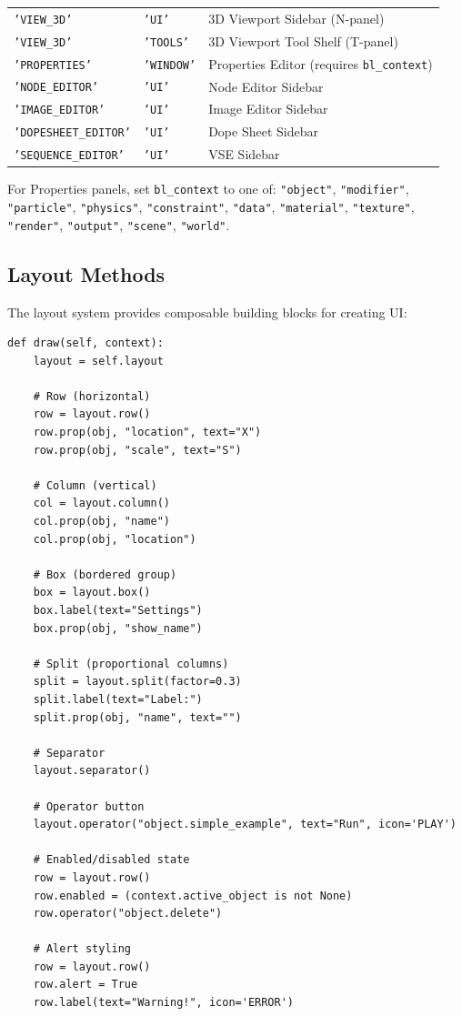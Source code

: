 \begin{center}
\begin{tabularx}{\textwidth}{L{3.8cm}L{2.8cm}X}
\toprule
{}
 &  &  \\
\midrule
\texttt{'VIEW\_3D'} & \texttt{'UI'} & 3D Viewport Sidebar (N-panel) \\
\texttt{'VIEW\_3D'} & \texttt{'TOOLS'} & 3D Viewport Tool Shelf (T-panel) \\
\texttt{'PROPERTIES'} & \texttt{'WINDOW'} & Properties Editor (requires \texttt{bl\_context}) \\
\texttt{'NODE\_EDITOR'} & \texttt{'UI'} & Node Editor Sidebar \\
\texttt{'IMAGE\_EDITOR'} & \texttt{'UI'} & Image Editor Sidebar \\
\texttt{'DOPESHEET\_EDITOR'} & \texttt{'UI'} & Dope Sheet Sidebar \\
\texttt{'SEQUENCE\_EDITOR'} & \texttt{'UI'} & VSE Sidebar \\
\bottomrule
\end{tabularx}
\end{center}

For Properties panels, set \texttt{bl\_context} to one of: \texttt{"object"}, \texttt{"modifier"}, \texttt{"particle"}, \texttt{"physics"}, \texttt{"constraint"}, \texttt{"data"}, \texttt{"material"}, \texttt{"texture"}, \texttt{"render"}, \texttt{"output"}, \texttt{"scene"}, \texttt{"world"}.

\subsection{Layout Methods}

The layout system provides composable building blocks for creating UI:

\begin{lstlisting}
def draw(self, context):
    layout = self.layout

    # Row (horizontal)
    row = layout.row()
    row.prop(obj, "location", text="X")
    row.prop(obj, "scale", text="S")

    # Column (vertical)
    col = layout.column()
    col.prop(obj, "name")
    col.prop(obj, "location")

    # Box (bordered group)
    box = layout.box()
    box.label(text="Settings")
    box.prop(obj, "show_name")

    # Split (proportional columns)
    split = layout.split(factor=0.3)
    split.label(text="Label:")
    split.prop(obj, "name", text="")

    # Separator
    layout.separator()

    # Operator button
    layout.operator("object.simple_example", text="Run", icon='PLAY')

    # Enabled/disabled state
    row = layout.row()
    row.enabled = (context.active_object is not None)
    row.operator("object.delete")

    # Alert styling
    row = layout.row()
    row.alert = True
    row.label(text="Warning!", icon='ERROR')
\end{lstlisting}

